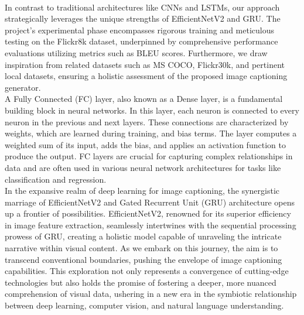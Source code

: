 \documentclass[oneside,a4paper,12pt]{report}
\begin{document}
\\
In contrast to traditional architectures like CNNs and LSTMs, our approach strategically leverages the unique strengths of EfficientNetV2 and GRU. The project's experimental phase encompasses rigorous training and meticulous testing on the Flickr8k dataset, underpinned by comprehensive performance evaluations utilizing metrics such as BLEU scores. Furthermore, we draw inspiration from related datasets such as MS COCO, Flickr30k, and pertinent local datasets, ensuring a holistic assessment of the proposed image captioning generator.
\\
A Fully Connected (FC) layer, also known as a Dense layer, is a fundamental building block in neural networks. In this layer, each neuron is connected to every neuron in the previous and next layers. These connections are characterized by weights, which are learned during training, and bias terms. The layer computes a weighted sum of its input, adds the bias, and applies an activation function to produce the output. FC layers are crucial for capturing complex relationships in data and are often used in various neural network architectures for tasks like classification and regression.
\\
In the expansive realm of deep learning for image captioning, the synergistic marriage of EfficientNetV2 and Gated Recurrent Unit (GRU) architecture opens up a frontier of possibilities. EfficientNetV2, renowned for its superior efficiency in image feature extraction, seamlessly intertwines with the sequential processing prowess of GRU, creating a holistic model capable of unraveling the intricate narrative within visual content. As we embark on this journey, the aim is to transcend conventional boundaries, pushing the envelope of image captioning capabilities. This exploration not only represents a convergence of cutting-edge technologies but also holds the promise of fostering a deeper, more nuanced comprehension of visual data, ushering in a new era in the symbiotic relationship between deep learning, computer vision, and natural language understanding.
\end{document}
